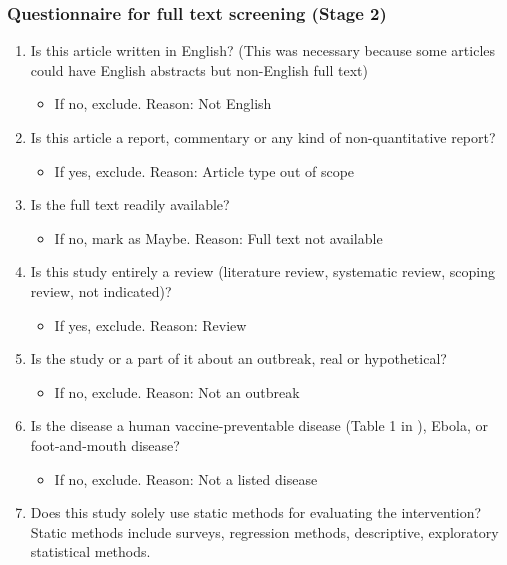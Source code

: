 \documentclass[10pt,letterpaper]{article}
\begin{document}
\subsubsection*{Questionnaire for full text screening (Stage 2)}
\begin{enumerate}
	\item Is this article written in English? (This was necessary because some articles could have English abstracts but non-English full text)
	\begin{itemize}
		\item 	If no, exclude. Reason: Not English	
	\end{itemize}
	\item Is this article a report, commentary or any kind of non-quantitative report?
	\begin{itemize}
		\item 	If yes, exclude. Reason: Article type out of scope
	\end{itemize}
	\item Is the full text readily available?
	\begin{itemize}
		\item 	If no, mark as Maybe. Reason: Full text not available	
	\end{itemize}
	\item Is this study entirely a review (literature review, systematic review, scoping review, not indicated)? 
	\begin{itemize}
		\item 	If yes, exclude. Reason: Review
	\end{itemize}
	\item Is the study or a part of it about an outbreak, real or hypothetical?
	\begin{itemize}
		\item 	If no, exclude. Reason: Not an outbreak
	\end{itemize}
	\item Is the disease a human vaccine-preventable disease (Table 1 in ), Ebola, or foot-and-mouth disease? 
	\begin{itemize}
		\item 	If no, exclude. Reason: Not a listed disease
	\end{itemize}
	\item Does this study solely use static methods for evaluating the intervention? Static methods include surveys, regression methods, descriptive, exploratory statistical methods.
	\begin{itemize}

\end{itemize}
\end{enumerate}
\end{document}
